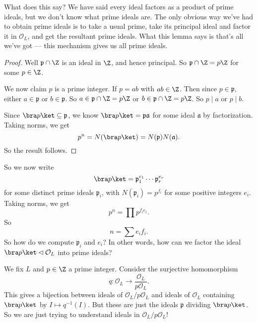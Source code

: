 \documentclass[a4paper]{article}
\begin{document}
What does this say? We have said every ideal factors as a product of prime ideals, but we don't know what prime ideals are. The only obvious way we've had to obtain prime ideals is to take a usual prime, take its principal ideal and factor it in $\mathcal{O}_L$, and get the resultant prime ideals. What this lemma says is that's all we've got --- this mechanism gives us all prime ideals.

\begin{proof}
  Well $\mathfrak{p} \cap \Z$ is an ideal in $\Z$, and hence principal. So $\mathfrak{p} \cap \Z = p\Z$ for some $p \in \Z$.

  We now claim $p$ is a prime integer. If $p = ab$ with $ab \in \Z$. Then since $p \in \mathfrak{p}$, either $a \in \mathfrak{p}$ or $b \in \mathfrak{p}$. So $a \in \mathfrak{p} \cap \Z = p\Z$ or $b \in \mathfrak{p} \cap \Z = p\Z$. So $p \mid a$ or $p \mid b$.

  Since $\bra p\ket \subseteq \mathfrak{p}$, we know $\bra p\ket = \mathfrak{p}\mathfrak{a}$ for some ideal $\mathfrak{a}$ by factorization. Taking norms, we get
  \[
    p^n = N(\bra p\ket) = N(\mathfrak{p}) N(\mathfrak{a}).
  \]
  So the result follows.
\end{proof}

So we now write
\[
  \bra p\ket = \mathfrak{p}_1^{e_1} \cdots \mathfrak{p}_r^{e_r}
\]
for some distinct prime ideals $\mathfrak{p}_i$, with $N(\mathfrak{p}_i) = p^{f_i}$ for some positive integers $e_i$. Taking norms, we get
\[
  p^n = \prod p^{f_i e_i}.
\]
So
\[
  n = \sum e_i f_i.
\]
So how do we compute $\mathfrak{p}_i$ and $e_i$? In other words, how can we factor the ideal $\bra p\ket \lhd \mathcal{O}_L$ into prime ideals?

We fix $L$ and $p \in \Z$ a prime integer. Consider the surjective homomorphism
\[
  q: \mathcal{O}_L \to \frac{\mathcal{O}_L}{p \mathcal{O}_L}.
\]
This gives a bijection between ideals of $\mathcal{O}_L/p \mathcal{O}_L$ and ideals of $\mathcal{O}_L$ containing $\bra p\ket$ by $I \mapsto q^{-1}(I)$. But these are just the ideals $\mathfrak{p}$ dividing $\bra p\ket$. So we are just trying to understand ideals in $\mathcal{O}_L/p \mathcal{O}_L$!
\end{document}
